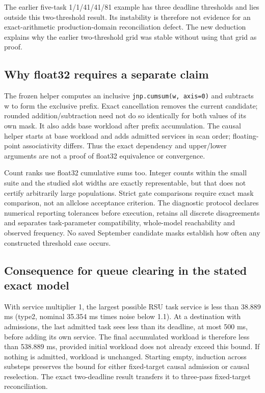 \documentclass[12pt,a4paper]{article}
\begin{document}
The earlier five-task 1/1/41/41/81 example has three deadline thresholds and lies outside this two-threshold result. Its instability is therefore not evidence for an exact-arithmetic production-domain reconciliation defect. The new deduction explains why the earlier two-threshold grid was stable without using that grid as proof.

\FloatBarrier
\subsection{Why float32 requires a separate claim}\label{sec:C.4}

The frozen helper computes an inclusive \texttt{jnp.cumsum(w, axis=0)} and subtracts w to form the exclusive prefix. Exact cancellation removes the current candidate; rounded addition/subtraction need not do so identically for both values of its own mask. It also adds base workload after prefix accumulation. The causal helper starts at base workload and adds admitted services in scan order; floating-point associativity differs. Thus the exact dependency and upper/lower arguments are not a proof of float32 equivalence or convergence.

Count ranks use float32 cumulative sums too. Integer counts within the small suite and the studied slot widths are exactly representable, but that does not certify arbitrarily large populations. Strict gate comparisons require exact mask comparison, not an allclose acceptance criterion. The diagnostic protocol declares numerical reporting tolerances before execution, retains all discrete disagreements and separates task-parameter compatibility, whole-model reachability and observed frequency. No saved September candidate masks establish how often any constructed threshold case occurs.

\FloatBarrier
\subsection{Consequence for queue clearing in the stated exact model}\label{sec:C.5}

With service multiplier 1, the largest possible RSU task service is less than 38.889 ms (type2, nominal 35.354 ms times noise below 1.1). At a destination with admissions, the last admitted task sees less than its deadline, at most 500 ms, before adding its own service. The final accumulated workload is therefore less than 538.889 ms, provided initial workload does not already exceed this bound. If nothing is admitted, workload is unchanged. Starting empty, induction across substeps preserves the bound for either fixed-target causal admission or causal reselection. The exact two-deadline result transfers it to three-pass fixed-target reconciliation.
\end{document}
